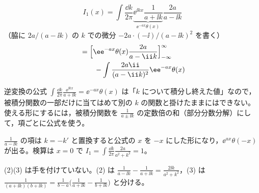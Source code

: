 \[ I_1(x)=\int\frac{\dd k}{2\pi}\underbrace{\ee^{\ii kx}\frac{1}{a+\ii k}}_{\ee^{-ax}\theta(x)}\frac{2a}{a-\ii k} \]
（脇に $2a/(a-\ii k)$ の $k$ での微分 $-2a\cdot(-\ii)/(a-\ii k)^{2}$ を書く）
\begin{align*}
  &=\Bigl[\ee^{-ax}\theta(x)\frac{2a}{a-\ii k}\Bigr]_{-\infty}^{\infty}\\
  &\qquad-\int\frac{2a\ii}{(a-\ii k)^{2}}\ee^{-ax}\theta(x)
\end{align*}
\mikai
{}
\mikai
\item 逆変換の公式 $\int\frac{\dd k}{2\pi}\frac{\ee^{\ii kx}}{a+\ii k}=\ee^{-ax}\theta(x)$ は「$k$ について積分し終えた値」なので，被積分関数の一部だけに当てはめて別の $k$ の関数と掛けたままにはできない。使える形にするには，被積分関数を $\frac{1}{a\pm\ii k}$ の定数倍の和（部分分数分解）にして，項ごとに公式を使う。
\item $\frac{1}{a-\ii k}$ の項は $k=-k'$ と置換すると公式の $x$ を $-x$ にした形になり，$\ee^{ax}\theta(-x)$ が出る。検算は $x=0$ で $I_1=\int\frac{\dd k}{2\pi}\frac{2a}{a^{2}+k^{2}}=1$。
\item (2)(3) は手を付けていない。(2) は $\frac{1}{a-\ii k}-\frac{1}{a+\ii k}=\frac{2\ii k}{a^{2}+k^{2}}$，(3) は $\frac{1}{(a+\ii k)(b+\ii k)}=\frac{1}{b-a}\bigl(\frac{1}{a+\ii k}-\frac{1}{b+\ii k}\bigr)$ と分ける。
